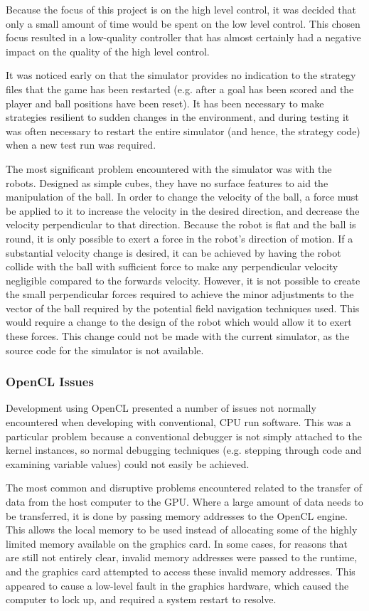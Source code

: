 \documentclass[10pt]{article}
\begin{document}
Because the focus of this project is on the high level control, it was decided
that only a small amount of time would be spent on the low level control.  This
chosen focus resulted in a low-quality controller that has almost certainly had
a negative impact on the quality of the high level control.

It was noticed early on that the simulator provides no indication to the
strategy files that the game has been restarted (e.g. after a goal has been
scored and the player and ball positions have been reset).  It has been
necessary to make strategies resilient to sudden changes in the environment, and
during testing it was often necessary to restart the entire simulator (and
hence, the strategy code) when a new test run was required.

The most significant problem encountered with the simulator was with the robots.
 Designed as simple cubes, they have no surface features to aid the manipulation
of the ball.  In order to change the velocity of the ball, a force must be
applied to it to increase the velocity in the desired direction, and decrease
the velocity perpendicular to that direction.  Because the robot is flat and the
ball is round, it is only possible to exert a force in the robot's direction of
motion. If a substantial velocity change is desired, it can be achieved by
having the robot collide with the ball with sufficient force to make any
perpendicular velocity negligible compared to the forwards velocity.  However,
it is not possible to create the small perpendicular forces required to achieve
the minor adjustments to the vector of the ball required by the potential field
navigation techniques used. This would require a change to the design of the
robot which would allow it to exert these forces.  This change could not be made
with the current simulator, as the source code for the simulator is not
available.

\subsubsection{OpenCL Issues}

Development using OpenCL presented a number of issues not normally encountered
when developing with conventional, CPU run software.  This was a particular
problem because a conventional debugger is not simply attached to the kernel
instances, so normal debugging techniques (e.g. stepping through code and
examining variable values) could not easily be achieved.

The most common and disruptive problems encountered related to the transfer of
data from the host computer to the GPU.  Where a large amount of data needs to
be transferred, it is done by passing memory addresses to the OpenCL engine. 
This allows the local memory to be used instead of allocating some of the highly
limited memory available on the graphics card.  In some cases, for reasons that
are still not entirely clear, invalid memory addresses were passed to the
runtime, and the graphics card attempted to access these invalid memory
addresses.  This appeared to cause a low-level fault in the graphics hardware,
which caused the computer to lock up, and required a system restart to resolve.
\end{document}
